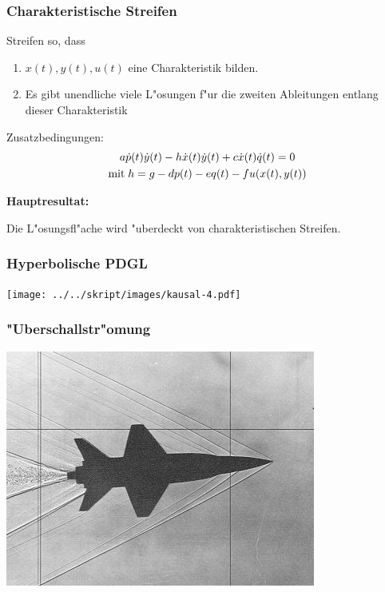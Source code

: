 \documentclass{beamer}
\begin{document}
\begin{frame}
\frametitle{Charakteristische Streifen}
Streifen so, dass
\begin{enumerate}
\item
$x(t), y(t), u(t)$ eine Charakteristik bilden.
\item
Es gibt unendliche viele L"osungen f"ur die zweiten Ableitungen entlang
dieser Charakteristik
\end{enumerate}

Zusatzbedingungen:
\begin{gather*}
a\dot p(t)\dot y(t)
-
h \dot x(t) \dot y(t)
+
c \dot x(t)\dot q(t)=0
\\
\text{mit\;}
h=g-dp(t)-eq(t)-fu(x(t),y(t))
\end{gather*}

\bigskip

{\bf Hauptresultat:}
\medskip

\begin{theorem}
Die L"osungsfl"ache wird "uberdeckt von charakteristischen Streifen.
\end{theorem}

\end{frame}

\begin{frame}
\frametitle{Hyperbolische PDGL}
\begin{center}
\texttt{[image: ../../skript/images/kausal-4.pdf]}
\end{center}
\end{frame}

\begin{frame}
\frametitle{"Uberschallstr"omung}
\begin{center}
\includegraphics[width=\hsize]{../../skript/graphics/i-5-1.jpg}
\end{center}
\end{frame}
\end{document}
